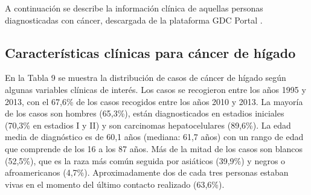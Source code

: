 A continuación se describe la información clínica de aquellas personas diagnosticadas con cáncer, descargada de la plataforma GDC Portal \cite{GDCPortal}. 

\subsection{Características clínicas para cáncer de hígado}

En la Tabla 9 se muestra  la distribución de casos de cáncer de hígado según algunas variables clínicas de interés. Los casos se recogieron entre los años 1995 y 2013, con el 67,6\% de los casos recogidos entre los años 2010 y 2013. La mayoría de los casos son hombres (65,3\%), están diagnosticados en estadios iniciales (70,3\% en estadios I y II) y son carcinomas hepatocelulares (89,6\%). La edad media de diagnóstico es de 60,1 años (mediana: 61,7 años) con un rango de edad que comprende de los 16 a los 87 años. Más de la mitad de los casos son blancos (52,5\%), que es la raza más común seguida por asiáticos (39,9\%) y negros o afroamericanos (4,7\%). Aproximadamente dos de cada tres personas estaban vivas en el momento del último contacto realizado (63,6\%).

